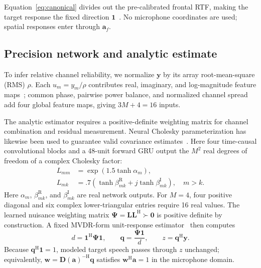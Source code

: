 \documentclass{article}
\begin{document}
Equation~\eqref{eq:canonical} divides out the pre-calibrated frontal RTF, making the target response the fixed direction $\mathbf1$~\cite{kovalyov2023dfsnet,lee2025afnet}. No microphone coordinates are used; spatial responses enter through $\mathbf a_f$.

\subsection{Precision network and analytic estimate}

To infer relative channel reliability, we normalize $\mathbf y$ by its array root-mean-square (RMS) $\rho$. Each $u_m=y_m/\rho$ contributes real, imaginary, and log-magnitude feature maps~\cite{hu2020dccrn,rong2024gtcrn}; common phase, pairwise power balance, and normalized channel spread add four global feature maps, giving $3M+4=16$ inputs.

The analytic estimator requires a positive-definite weighting matrix for channel combination and residual measurement. Neural Cholesky parameterization has likewise been used to guarantee valid covariance estimates~\cite{deppisch2026mimo}. Here four time-causal convolutional blocks and a 48-unit forward GRU output the $M^2$ real degrees of freedom of a complex Cholesky factor:
\begin{equation}
\begin{aligned}
L_{mm}&=\exp(1.5\tanh\alpha_m),\\
L_{mk}&=.7(\tanh\beta^{\mathrm R}_{mk}+j\tanh\beta^{\mathrm I}_{mk}),\quad m>k.
\end{aligned}
\label{eq:cholesky}
\end{equation}
Here $\alpha_m$, $\beta^{\mathrm R}_{mk}$, and $\beta^{\mathrm I}_{mk}$ are real network outputs. For $M=4$, four positive diagonal and six complex lower-triangular entries require 16 real values. The learned nuisance weighting matrix $\boldsymbol\Psi=\mathbf L\mathbf L^{\mathrm H}\succ\mathbf0$ is positive definite by construction. A fixed MVDR-form unit-response estimator~\cite{tesch2021nonlinear} then computes
\begin{equation}
d=\mathbf1^{\mathrm H}\boldsymbol\Psi\mathbf1,\qquad
\mathbf q=\frac{\boldsymbol\Psi\mathbf1}{d},\qquad
z=\mathbf q^{\mathrm H}\mathbf y.
\label{eq:analytic}
\end{equation}
Because $\mathbf q^{\mathrm H}\mathbf1=1$, modeled target speech passes through $z$ unchanged; equivalently, $\mathbf w=\mathbf D(\mathbf a)^{-\mathrm H}\mathbf q$ satisfies $\mathbf w^{\mathrm H}\mathbf a=1$ in the microphone domain.
\end{document}

